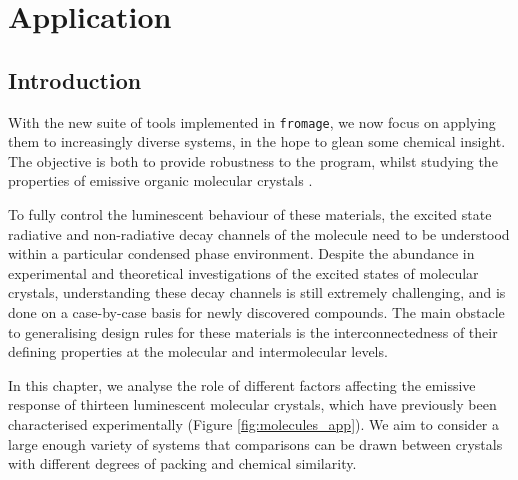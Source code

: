 \chapter{Application}
\label{chap:molecules}
\section{Introduction}

With the new suite of tools implemented in \texttt{fromage}, we now focus on applying them to increasingly diverse systems, in the hope to glean some chemical insight. The objective is both to provide robustness to the program, whilst studying the properties of emissive organic molecular crystals .

To fully control the luminescent behaviour of these materials, the excited state radiative and non-radiative decay channels of the molecule need to be understood within a particular condensed phase environment. Despite the abundance in experimental and theoretical investigations of the excited states of molecular crystals, understanding these decay channels is still extremely challenging, and is done on a case-by-case basis for newly discovered compounds. The main obstacle to generalising design rules for these materials is the interconnectedness of their defining properties at the molecular and intermolecular levels.

In this chapter, we analyse the role of different factors affecting the emissive response of thirteen luminescent molecular crystals, which have previously been characterised experimentally (Figure \ref{fig:molecules_app}). We aim to consider a large enough variety of systems that comparisons can be drawn between crystals with different degrees of packing and chemical similarity. 

